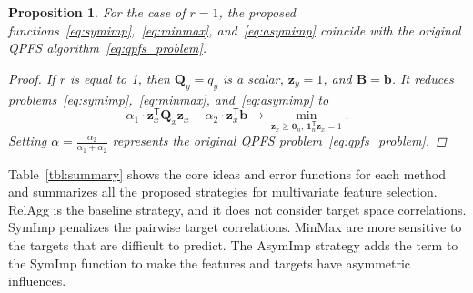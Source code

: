 \documentclass[preprint,authoryear,12pt]{elsarticle}
\newtheorem{proposition}{Proposition}
\theoremstyle{definition}
\newcommand{\bz}{\mathbf{z}}
\newcommand{\bb}{\mathbf{b}}
\newcommand{\bB}{\mathbf{B}}
\newcommand{\bQ}{\mathbf{Q}}
\newcommand{\T}{\mathsf{T}}
\newcommand{\bOne}{\boldsymbol{1}}
\newcommand{\bZero}{\boldsymbol{0}}
\begin{document}
\begin{proposition}
	For the case of $r=1$, the proposed functions~\eqref{eq:symimp},~\eqref{eq:minmax}, and~\eqref{eq:asymimp} coincide with the original QPFS algorithm~\eqref{eq:qpfs_problem}.
	
	\begin{proof}
		If $r$ is equal to 1, then $\bQ_y = q_y$ is a scalar, $\bz_y = 1$, and $\bB = \bb$. It reduces problems~\eqref{eq:symimp},~\eqref{eq:minmax}, and~\eqref{eq:asymimp} to
		\begin{equation*}
		\alpha_1 \cdot \bz_x^{\T} \bQ_x \bz_x - \alpha_2 \cdot \bz_x^{\T} \bb \rightarrow \min_{\bz_x \geq \bZero_n, \, \bOne_n^{\T}\bz_x=1} .
		\end{equation*}
		Setting $\alpha = \frac{\alpha_2}{\alpha_1 + \alpha_2}$ represents the original QPFS problem~\eqref{eq:qpfs_problem}.
	\end{proof}
\end{proposition}

Table~\ref{tbl:summary} shows the core ideas and error functions for each method and summarizes all the proposed strategies for multivariate feature selection. 
RelAgg is the baseline strategy, and it does not consider target space correlations.
SymImp penalizes the pairwise target correlations.
MinMax are more sensitive to the targets that are difficult to predict.
The AsymImp strategy adds the term to the SymImp function to make the features and targets have asymmetric influences. 
\end{document}
